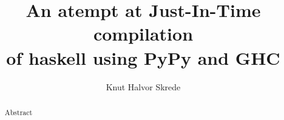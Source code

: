 \documentclass{article}
\begin{document}
\title{An atempt at Just-In-Time compilation\\of haskell using PyPy and GHC}
\author{Knut Halvor Skrede}
\maketitle

\begin{abstract}
Abstract
\end{abstract}

\clearpage

\tableofcontents

\clearpage

\setlength\LTleft{0pt}
\setlength\LTright{0pt}





















\end{document}
